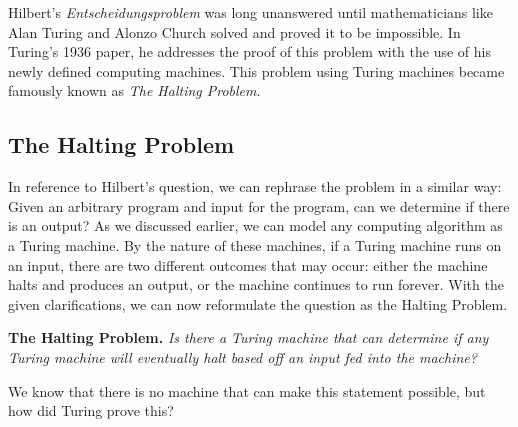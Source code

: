 \documentclass[12pt]{article}
\begin{document}
 Hilbert's \textit{Entscheidungsproblem} was long unanswered until mathematicians like Alan Turing and Alonzo Church solved and proved it to be impossible. In Turing's 1936 paper, he addresses the proof of this problem with the use of his newly defined computing machines. This problem using Turing machines became famously known as \textit{The Halting Problem}.

\subsection{The Halting Problem}

In reference to Hilbert's question, we can rephrase the problem in a similar way: Given an arbitrary program and input for the program, can we determine if there is an output? As we discussed earlier, we can model any computing algorithm as a Turing machine. By the nature of these machines, if a Turing machine runs on an input, there are two different outcomes that may occur: either the machine halts and produces an output, or the machine continues to run forever. With the given clarifications, we can now reformulate the question as the Halting Problem.\newline

\noindent \textbf{The Halting Problem.} \textit{Is there a Turing machine that can determine if any Turing machine will eventually halt based off an input fed into the machine?}\newline

\noindent We know that there is no machine that can make this statement possible, but how did Turing prove this?
\end{document}

